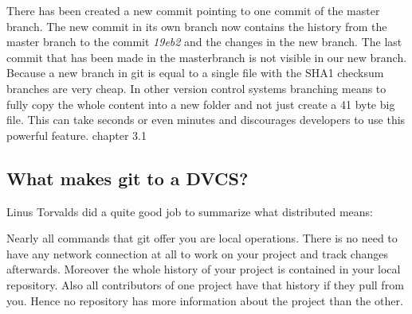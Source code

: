 There has been created a new commit pointing to one commit of the master branch.
The new commit in its own branch now contains the history from the master branch
to the commit \emph{19eb2} and the changes in the new branch. The last commit
that has been made in the masterbranch is not visible in our new branch. \\
Because a new branch in git is equal to a single file with the SHA1 checksum
branches are very cheap. In other version control systems branching means to
fully copy the whole content into a new folder and not just create a 41 byte big
file. This can take seconds or even minutes and discourages developers to use
this powerful feature. \cite{gitpro2009} chapter 3.1 \\

\subsection {What makes git to a DVCS?}

Linus Torvalds did a quite good job to summarize what distributed means:

 \cite{googletechtalk2007}

Nearly all commands that git offer you are local operations. There is no need to
have any network connection at all to work on your project and track changes
afterwards. Moreover the whole history of your project is contained in your
local repository. Also all contributors of one project have that history if
they pull from you. Hence no repository has more information about the project
than the other.
